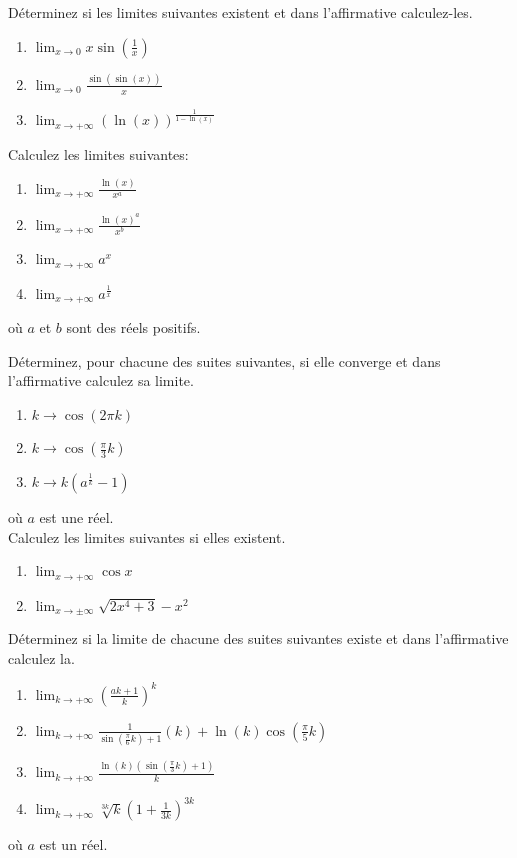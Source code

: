 \exerNico Déterminez si les limites suivantes existent et dans
l'affirmative calculez-les.
\begin{enumerate}
	\item $  \lim_{x \rightarrow  0} x \sin(\frac{1}{x}) $
	\item $  \lim_{x \rightarrow  0} \frac{\sin(\sin(x))}{x} $
	\item $  \lim_{x \rightarrow  +\infty} (\ln(x))^\frac{1}{1 - \ln(x)}$
\end{enumerate}

\exerNico Calculez les limites suivantes:
\begin{enumerate}
	\item $  \lim_{x \rightarrow  +\infty} \frac{\ln(x)}{x ^a} $
	\item $  \lim_{x \rightarrow  +\infty} \frac{\ln(x)^a}{x ^b} $
	\item $  \lim_{x \rightarrow  +\infty} a ^x $
	\item $  \lim_{x \rightarrow  +\infty} a ^\frac{1}{x} $
\end{enumerate}
où $a$ et $b$ sont des réels positifs.
%

%

\exerNico Déterminez, pour chacune des suites suivantes, si elle converge
et dans l'affirmative calculez sa limite.
\begin{enumerate}
	\item $  k \rightarrow  \cos( 2 \pi k) $
	\item $  k \rightarrow  \cos(\frac{\pi}{3} k) $
	\item $  k \rightarrow  k(a ^\frac{1}{k} -1 ) $
\end{enumerate}
où $a$ est une réel.\\



\exerNico Calculez  les limites suivantes si elles existent.
\begin{enumerate}
	\item $  \lim_{x \rightarrow  +\infty} \cos x $
	\item $  \lim_{x \rightarrow  \pm \infty }\sqrt{2x^4+3}-x^2 $

\end{enumerate}

\exerNico Déterminez si la limite de chacune des suites suivantes
existe et dans l'affirmative calculez la.
\begin{enumerate}
	\item $  \lim_{k \rightarrow  +\infty }(\frac{a k +1}{k})^k $
	\item $  \lim_{k \rightarrow  +\infty}\frac{1}{\sin(\frac{\pi}{6}k)+1}(k) + \ln(k)\cos(\frac{\pi}{5}k)$
	\item $  \lim_{k \rightarrow  +\infty} \frac{\ln(k)(\sin(\frac{\pi}{3}k) +1)}{k} $
	\item $  \lim_{k \rightarrow  +\infty } \sqrt[3k]{k} (1 +
		      \frac{1}{3k})^{3k} $
\end{enumerate}
où $a$ est un réel.

